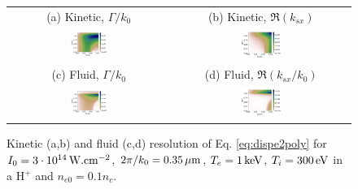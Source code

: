 \documentclass[
 reprint,
 amsmath,amssymb,
 aps,
]{revtex4-1}
\begin{document}
\begin{figure}
\begin{tabular}{cc}
(a) Kinetic, $\Gamma/k_0$ &
(b)  Kinetic, $\Re(k_{sx})$ \\
\includegraphics[width=0.24\textwidth]{G_Te1keV_Ti300_3e14_3w_1e-1nc_Hp.png}&
\includegraphics[width=0.24\textwidth]{k_Te1keV_Ti300_3e14_3w_1e-1nc_Hp.png}\\
(c) Fluid, $\Gamma/k_0$  &
(d) Fluid, $\Re(k_{sx}/k_0)$  \\
\includegraphics[width=0.24\textwidth]{Gf_Te1keV_Ti300_3e14_3w_1e-1nc_Hp.png}&
\includegraphics[width=0.24\textwidth]{kf_Te1keV_Ti300_3e14_3w_1e-1nc_Hp.png}
\end{tabular}
\caption{ \label{fig:dispe}  
Kinetic (a,b) and fluid (c,d) resolution of Eq. \eqref{eq:dispe2poly} for  $I_0 = 3\cdot 10^{14}\, \rm W.cm^{-2}$, $2\pi/k_0=0.35 \,\rm\mu m$, $T_e =1\,\rm  keV$, $ T_i=300\,  \rm eV$ in a H$^+$ and $n_{e0}=0.1n_c$.
 }
\end{figure}
\end{document}
